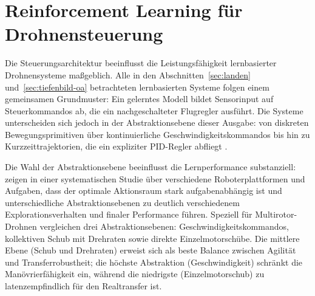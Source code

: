 \section{Reinforcement Learning für Drohnensteuerung}
\label{sec:architektur}

Die Steuerungsarchitektur beeinflusst die Leistungsfähigkeit lernbasierter Drohnensysteme maßgeblich. Alle in den Abschnitten~\ref{sec:landen} und~\ref{sec:tiefenbild-oa} betrachteten lernbasierten Systeme folgen einem gemeinsamen Grundmuster: Ein gelerntes Modell bildet Sensorinput auf Steuerkommandos ab, die ein nachgeschalteter Flugregler ausführt. Die Systeme unterscheiden sich jedoch in der Abstraktionsebene dieser Ausgabe: von diskreten Bewegungsprimitiven \autocite{polvaraSimtoRealQuadrotorLanding2020, kimMonocularVisionbasedAutonomous2022, bartolomeiAutonomousEmergencyLanding2022} über kontinuierliche Geschwindigkeitskommandos \autocite{ladoszAutonomousLandingMoving2024} bis hin zu Kurzzeittrajektorien, die ein expliziter PID-Regler abfliegt \autocite{loquercioLearningHighspeedFlight2021}.

Die Wahl der Abstraktionsebene beeinflusst die Lernperformance substanziell: \textcite{esserActionSpaceDesign2025} zeigen in einer systematischen Studie über verschiedene Roboterplattformen und Aufgaben, dass der optimale Aktionsraum stark aufgabenabhängig ist und unterschiedliche Abstraktionsebenen zu deutlich verschiedenem Explorationsverhalten und finaler Performance führen. Speziell für Multirotor-Drohnen vergleichen \textcite{kaufmannBenchmarkComparisonLearned2022} drei Abstraktionsebenen: Geschwindigkeitskommandos, kollektiven Schub mit Drehraten sowie direkte Einzelmotorschübe. Die mittlere Ebene (Schub und Drehraten) erweist sich als beste Balance zwischen Agilität und Transferrobustheit; die höchste Abstraktion (Geschwindigkeit) schränkt die Manövrierfähigkeit ein, während die niedrigste (Einzelmotorschub) zu latenzempfindlich für den Realtransfer ist.

